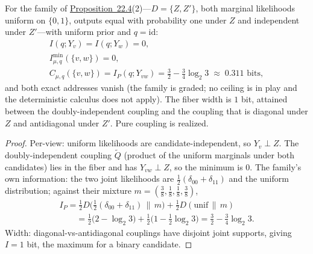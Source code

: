 \begin{thmplain}

For the family of \hyperlink{stmt:22.4}{Proposition~22.4}(2)---\hspace{0pt}\(D = \{Z, Z'\}\), both marginal likelihoods uniform on \(\{0,1\}\), outputs equal with probability one under \(Z\) and independent under \(Z'\)---\hspace{0pt}with uniform prior and \(q = \mathrm{id}\):
\[\begin{gathered}I(q; Y_v) = I(q; Y_w) = 0, \\ I^{\min}_{\mu,q}(\{v,w\}) = 0, \\ C_{\mu,q}(\{v,w\}) = I_P(q; Y_{vw}) = \tfrac32 - \tfrac34 \log_2 3 \;\approx\; 0.311 \text{ bits},\end{gathered}\]
and both exact addresses vanish (the family is graded; no ceiling is in play and the deterministic calculus does not apply). The fiber width is \(1\) bit, attained between the doubly-independent coupling and the coupling that is diagonal under \(Z\) and antidiagonal under \(Z'\). Pure coupling is realized.
\end{thmplain}

\begin{proof}

Per-view: uniform likelihoods are candidate-independent, so \(Y_v \perp Z\). The doubly-independent coupling \(\widetilde{Q}\) (product of the uniform marginals under both candidates) lies in the fiber and has \(Y_{vw} \perp Z\), so the minimum is \(0\). The family's own information: the two joint likelihoods are \(\tfrac12(\delta_{00} + \delta_{11})\) and the uniform distribution; against their mixture \(m = (\tfrac38, \tfrac18, \tfrac18, \tfrac38)\),
\[\begin{gathered}I_P = \tfrac12 D\big(\tfrac12(\delta_{00}{+}\delta_{11}) \,\|\, m\big) + \tfrac12 D(\mathrm{unif} \,\|\, m) \\ {}\qquad = \tfrac12\big(2 - \log_2 3\big) + \tfrac12\big(1 - \tfrac12 \log_2 3\big) = \tfrac32 - \tfrac34 \log_2 3 .\end{gathered}\]
Width: diagonal-vs-antidiagonal couplings have disjoint joint supports, giving \(I = 1\) bit, the maximum for a binary candidate.
\end{proof}

